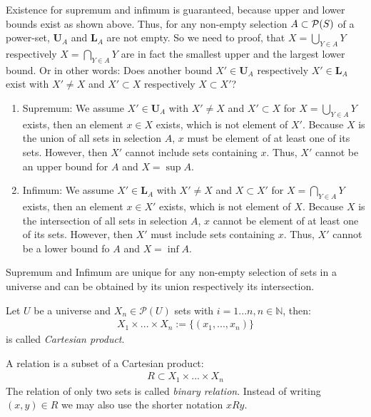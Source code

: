 Existence for supremum and infimum is guaranteed, because upper and lower bounds exist as shown above.
Thus, for any non-empty selection $A \subset \mathcal{P}(S)$ of a power-set, $\mathbf{U}_A$ and $\mathbf{L}_A$ are not empty.
So we need to proof, that $X = \bigcup\limits_{Y \in A} Y$ respectively $X = \bigcap\limits_{Y \in A} Y$ are in fact the smallest upper and the  largest lower bound.
Or in other words:
Does another bound $X' \in \mathbf{U}_A$ respectively $X' \in \mathbf{L}_A$ exist with $X' \neq X$ and $X' \subset X$ respectively $X \subset X'$?
\begin{enumerate}
\item
Supremum:
We assume $X' \in \mathbf{U}_A$ with $X' \neq X$ and $X' \subset X$ for $X = \bigcup\limits_{Y \in A} Y$ exists, then an element $x \in X$ exists, which is not element of $X'$.
Because $X$ is the union of all sets in selection $A$, $x$ must be element of at least one of its sets.
However, then $X'$ cannot include sets containing $x$.
Thus, $X'$ cannot be an upper bound for $A$ and $X = \sup A$.

\item
Infimum:
We assume $X' \in \mathbf{L}_A$ with $X' \neq X$ and $X \subset X'$ for $X = \bigcap\limits_{Y \in A} Y$ exists, then an element $x \in X'$ exists, which is not element of $X$.
Because $X$ is the intersection of all sets in selection $A$, $x$ cannot be element of at least one of its sets.
However, then $X'$ must include sets containing $x$.
Thus, $X'$ cannot be a lower bound fo $A$ and $X = \inf A$.

\end{enumerate}
Supremum and Infimum are unique for any non-empty selection of sets in a universe and can be obtained by its union respectively its intersection.

\begin{definition}
Let $U$ be a universe and $X_n \in \mathcal{P}(U)$ sets with $ i=1...n, n \in \mathbb{N}$, then:
\begin{align}
X_1 \times ... \times X_n := \{ (x_1,..., x_n) \}
\end{align} 
is called \emph{Cartesian product}.
\end{definition}

\begin{definition}[Relation]
A relation is a subset of a Cartesian product:
\begin{align}
R \subset X_1 \times ... \times X_n 
\end{align}
The relation of only two sets is called \emph{binary relation}.
Instead of writing $(x,y) \in R$ we may also use the shorter notation $xRy$.
\end{definition}

